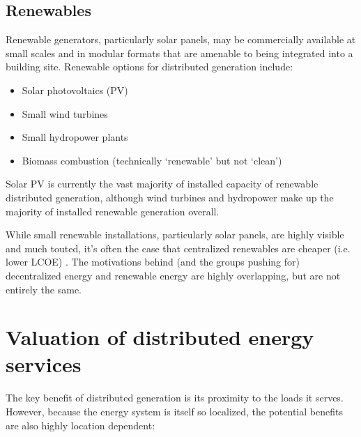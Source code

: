 \documentclass[10pt]{article}
\begin{document}
\subsection{Renewables}

Renewable generators, particularly solar panels, may be commercially available at small scales and in modular formats that are amenable to being integrated into a building site.  Renewable options for distributed generation include:

\vspace{-6pt}
\begin{itemize}
    \setlength{\itemsep}{0pt}%
    \setlength{\parskip}{0pt}%
    \item Solar photovoltaics (PV)
    \item Small wind turbines
    \item Small hydropower plants
    \item Biomass combustion (technically `renewable' but not `clean')
\end{itemize}
\vspace{-6pt}

Solar PV is currently the vast majority of installed capacity of renewable distributed generation, although wind turbines and hydropower make up the majority of installed renewable generation overall.

While small renewable installations, particularly solar panels, are highly visible and much touted, it's often the case that centralized renewables are cheaper (i.e. lower LCOE) \cite{Trabish2013-cn}. The motivations behind (and the groups pushing for) decentralized energy and renewable energy are highly overlapping, but are not entirely the same. %

\section{Valuation of distributed energy services}

The key benefit of distributed generation is its proximity to the loads it serves. However, because the energy system is itself so localized, the potential benefits are also highly location dependent:
\end{document}
